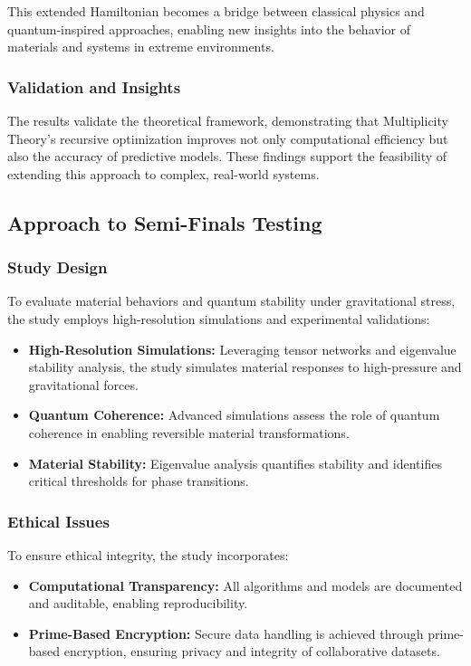 \documentclass{article}
\theoremstyle{plain}
\begin{document}
This extended Hamiltonian becomes a bridge between classical physics and quantum-inspired approaches, enabling new insights into the behavior of materials and systems in extreme environments.


\subsubsection{Validation and Insights}
The results validate the theoretical framework, demonstrating that Multiplicity Theory's recursive optimization improves not only computational efficiency but also the accuracy of predictive models. These findings support the feasibility of extending this approach to complex, real-world systems.

\subsection{Approach to Semi-Finals Testing}

\subsubsection*{Study Design}
To evaluate material behaviors and quantum stability under gravitational stress, the study employs high-resolution simulations and experimental validations:
\begin{itemize}
    \item \textbf{High-Resolution Simulations:} Leveraging tensor networks and eigenvalue stability analysis, the study simulates material responses to high-pressure and gravitational forces.
    \item \textbf{Quantum Coherence:} Advanced simulations assess the role of quantum coherence in enabling reversible material transformations.
    \item \textbf{Material Stability:} Eigenvalue analysis quantifies stability and identifies critical thresholds for phase transitions.
\end{itemize}

\subsubsection{Ethical Issues}
To ensure ethical integrity, the study incorporates:
\begin{itemize}
    \item \textbf{Computational Transparency:} All algorithms and models are documented and auditable, enabling reproducibility.
    \item \textbf{Prime-Based Encryption:} Secure data handling is achieved through prime-based encryption, ensuring privacy and integrity of collaborative datasets.
\end{itemize}
\end{document}
